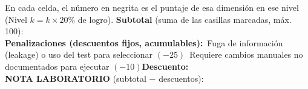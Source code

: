 \documentclass[11pt,letterpaper]{article}
\newcommand{\chk}{\framebox[0.42cm]{\rule{0pt}{0.30cm}}}
\begin{document}
\vspace{0.2cm}
{\small
En cada celda, el número en negrita es el puntaje de esa dimensión en ese nivel (Nivel $k = k\times 20\%$ de logro). \textbf{Subtotal} (suma de las casillas marcadas, máx. 100): \underline{\hspace{2cm}}\\[0.2cm]
\textbf{Penalizaciones (descuentos fijos, acumulables):}\quad \chk\ Fuga de información (leakage) o uso del test para seleccionar $(-25)$\quad \chk\ Requiere cambios manuales no documentados para ejecutar $(-10)$\quad \textbf{Descuento:} \underline{\hspace{1.6cm}}\\[0.2cm]
\textbf{NOTA LABORATORIO} (subtotal $-$ descuentos): \underline{\hspace{2.2cm}}
}
\end{document}
